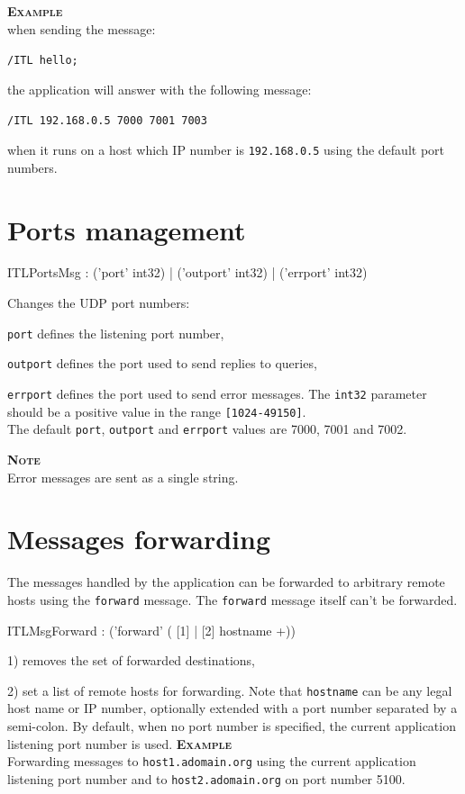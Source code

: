 \documentclass[a4paper,twoside]{report}
\newcommand{\sublevel}[1]	{\section{#1}}
\newcommand{\OSC}[1]		{\texttt{#1}}
\newcommand{\values}[1]		{\texttt{#1}}
\newcommand{\example}		{\textbf{\hspace{-1.5cm}\textbf{\textsc{Example }}}}
\newcommand{\note}	[1]		{\vspace{2mm}\textbf{\hspace{-1.03cm}\textbf{\textsc{Note #1}}}}
\let\olditemize\itemize
\let\oldenditemize\enditemize
\renewenvironment{itemize} 	{\olditemize \setlength{\itemsep}{1mm}}{\oldenditemize}
\newcommand{\sample}	[1]			{\vspace{-2mm}\begin{center}\colorbox{mygrey}{
								\begin{minipage}[t]{0.9\columnwidth} 
								{\small \texttt{#1}}
								\end{minipage}}\end{center}}
\newcommand{\sampleindent}	{ \hspace{0.5cm} }
\begin{document}
\example \\
when sending the message:
\sample{/ITL hello;}
\sampleindent the application will answer with the following message:
\sample{/ITL 192.168.0.5  7000 7001 7003}
\sampleindent when it runs on a host which IP number is \OSC{192.168.0.5} using the default port numbers.

\sublevel{Ports management}
\label{ITLPorts}

\begin{rail}
ITLPortsMsg : ('port' int32)
		| ('outport' int32)
		| ('errport' int32)
\end{rail}

Changes the UDP port numbers:
\begin{itemize}
\item \OSC{port} defines the listening port number, 
\item \OSC{outport} defines the port used to send replies to queries, 
\item \OSC{errport} defines the port used to send error messages. 
\end{itemize}
The \OSC{int32} parameter should be a positive value in the range \values{[1024-49150]}. \\
The default \OSC{port}, \OSC{outport} and \OSC{errport} values are 7000, 7001 and 7002.

\note{} \\
Error messages are sent as a single string.

\sublevel{Messages forwarding}
\label{ITLForward}

The messages handled by the application can be forwarded to arbitrary remote hosts using the \OSC{forward} message. The \OSC{forward} message itself can't be forwarded. 
 
\begin{rail}
ITLMsgForward : ('forward' ( [1] | [2] hostname +))
\end{rail}

\begin{itemize}

\item 1) removes the set of forwarded destinations,
\item 2) set a list of remote hosts for forwarding. Note that \OSC{hostname} can be any legal host name or IP number, optionally extended with a port number separated by a semi-colon. By default, when no port number is specified, the current application listening port number is used.
\end{itemize}
\example\\
Forwarding messages to \OSC{host1.adomain.org} using the current application listening port number
and to \OSC{host2.adomain.org} on port number 5100.
\end{document}
